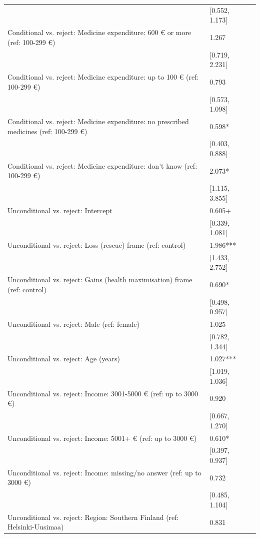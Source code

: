 \begin{tabular}{lll}
& [\num{0.552}, \num{1.173}] &  \\
Conditional vs. reject: Medicine expenditure: 600 € or more (ref: 100-299 €) & \num{1.267} &  \\
& [\num{0.719}, \num{2.231}] &  \\
Conditional vs. reject: Medicine expenditure: up to 100 € (ref: 100-299 €) & \num{0.793} &  \\
& [\num{0.573}, \num{1.098}] &  \\
Conditional vs. reject: Medicine expenditure: no prescribed medicines (ref: 100-299 €) & \num{0.598}* &  \\
& [\num{0.403}, \num{0.888}] &  \\
Conditional vs. reject: Medicine expenditure: don't know (ref: 100-299 €) & \num{2.073}* &  \\
& [\num{1.115}, \num{3.855}] &  \\
Unconditional vs. reject: Intercept & \num{0.605}+ &  \\
& [\num{0.339}, \num{1.081}] &  \\
Unconditional vs. reject: Loss (rescue) frame (ref: control) & \num{1.986}*** &  \\
& [\num{1.433}, \num{2.752}] &  \\
Unconditional vs. reject: Gains (health maximisation) frame (ref: control) & \num{0.690}* &  \\
& [\num{0.498}, \num{0.957}] &  \\
Unconditional vs. reject: Male (ref: female) & \num{1.025} &  \\
& [\num{0.782}, \num{1.344}] &  \\
Unconditional vs. reject: Age (years) & \num{1.027}*** &  \\
& [\num{1.019}, \num{1.036}] &  \\
Unconditional vs. reject: Income: 3001-5000 € (ref: up to 3000 €) & \num{0.920} &  \\
& [\num{0.667}, \num{1.270}] &  \\
Unconditional vs. reject: Income: 5001+ € (ref: up to 3000 €) & \num{0.610}* &  \\
& [\num{0.397}, \num{0.937}] &  \\
Unconditional vs. reject: Income: missing/no answer (ref: up to 3000 €) & \num{0.732} &  \\
& [\num{0.485}, \num{1.104}] &  \\
Unconditional vs. reject: Region: Southern Finland (ref: Helsinki-Uusimaa) & \num{0.831} &  \\

\end{tabular}
